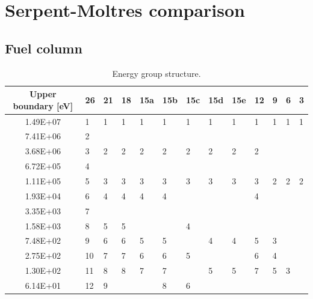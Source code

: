 \section{Serpent-Moltres comparison}

\subsection{Fuel column}

\begin{table}[htbp!]
  \centering
  \caption{Energy group structure.}
  \begin{tabular}{c|l|l|l|l|l|l|l|l|l|l|l|l}
  \toprule
  Upper boundary [eV] & 26    & 21   & 18   & 15a & 15b & 15c & 15d & 15e   & 12  & 9  & 6  & 3 \\
  \midrule
  1.49E+07            & 1     & 1    & 1    & 1   & 1   & 1   & 1   & 1     & 1   & 1  & 1  & 1 \\ \cline{1-2}
  7.41E+06            & 2     &      &      &     &     &     &     &       &     &    &    &   \\ \cline{1-10}
  3.68E+06            & 3     & 2    & 2    & 2   & 2   & 2   & 2   & 2     & 2   &    &    &   \\ \cline{1-2}
  6.72E+05            & 4     &      &      &     &     &     &     &       &     &    &    &   \\ \hline
  1.11E+05            & 5     & 3    & 3    & 3   & 3   & 3   & 3   & 3     & 3   & 2  & 2  & 2 \\ \cline{1-6} \cline{10-10}
  1.93E+04            & 6     & 4    & 4    & 4   & 4   &     &     &       & 4   &    &    &   \\ \cline{1-2}
  3.35E+03            & 7     &      &      &     &     &     &     &       &     &    &    &   \\ \cline{1-4} \cline{7-7}
  1.58E+03            & 8     & 5    & 5    &     &     & 4   &     &       &     &    &    &   \\ \cline{1-6} \cline{8-11}
  7.48E+02            & 9     & 6    & 6    & 5   & 5   &     & 4   & 4     & 5   & 3  &    &   \\ \cline{1-7} \cline{10-11}
  2.75E+02            & 10    & 7    & 7    & 6   & 6   & 5   &     &       & 6   & 4  &    &   \\ \cline{1-6} \cline{8-12}
  1.30E+02            & 11    & 8    & 8    & 7   & 7   &     & 5   & 5     & 7   & 5  & 3  &   \\ \cline{1-3} \cline{6-7}
  6.14E+01            & 12    & 9    &      &     & 8   & 6   &     &       &     &    &    &   \\ \cline{1-6} \cline{8-9}

\end{tabular}
\end{table}
